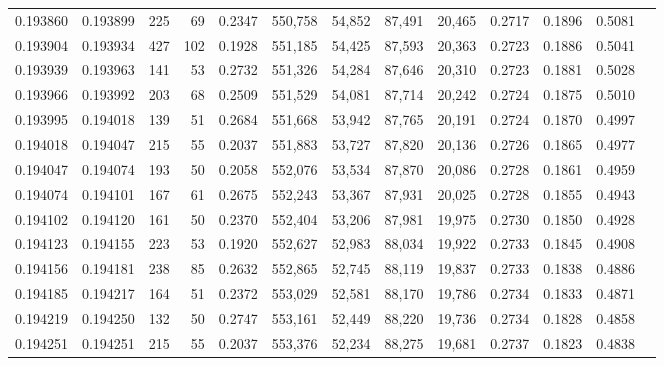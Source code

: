 \begin{tabular}{rrrrrrrrrrrrr}
0.193860 & 0.193899 &   225 &  69 &                                     0.2347 & 550,758 &  54,852 &  87,491 &  20,465 & 0.2717 & 0.1896 & 0.5081 \\
0.193904 & 0.193934 &   427 & 102 &                                     0.1928 & 551,185 &  54,425 &  87,593 &  20,363 & 0.2723 & 0.1886 & 0.5041 \\
0.193939 & 0.193963 &   141 &  53 &                                     0.2732 & 551,326 &  54,284 &  87,646 &  20,310 & 0.2723 & 0.1881 & 0.5028 \\
0.193966 & 0.193992 &   203 &  68 &                                     0.2509 & 551,529 &  54,081 &  87,714 &  20,242 & 0.2724 & 0.1875 & 0.5010 \\
0.193995 & 0.194018 &   139 &  51 &                                     0.2684 & 551,668 &  53,942 &  87,765 &  20,191 & 0.2724 & 0.1870 & 0.4997 \\
0.194018 & 0.194047 &   215 &  55 &                                     0.2037 & 551,883 &  53,727 &  87,820 &  20,136 & 0.2726 & 0.1865 & 0.4977 \\
0.194047 & 0.194074 &   193 &  50 &                                     0.2058 & 552,076 &  53,534 &  87,870 &  20,086 & 0.2728 & 0.1861 & 0.4959 \\
0.194074 & 0.194101 &   167 &  61 &                                     0.2675 & 552,243 &  53,367 &  87,931 &  20,025 & 0.2728 & 0.1855 & 0.4943 \\
0.194102 & 0.194120 &   161 &  50 &                                     0.2370 & 552,404 &  53,206 &  87,981 &  19,975 & 0.2730 & 0.1850 & 0.4928 \\
0.194123 & 0.194155 &   223 &  53 &                                     0.1920 & 552,627 &  52,983 &  88,034 &  19,922 & 0.2733 & 0.1845 & 0.4908 \\
0.194156 & 0.194181 &   238 &  85 &                                     0.2632 & 552,865 &  52,745 &  88,119 &  19,837 & 0.2733 & 0.1838 & 0.4886 \\
0.194185 & 0.194217 &   164 &  51 &                                     0.2372 & 553,029 &  52,581 &  88,170 &  19,786 & 0.2734 & 0.1833 & 0.4871 \\
0.194219 & 0.194250 &   132 &  50 &                                     0.2747 & 553,161 &  52,449 &  88,220 &  19,736 & 0.2734 & 0.1828 & 0.4858 \\
0.194251 & 0.194251 &   215 &  55 &                                     0.2037 & 553,376 &  52,234 &  88,275 &  19,681 & 0.2737 & 0.1823 & 0.4838 \\

\end{tabular}
